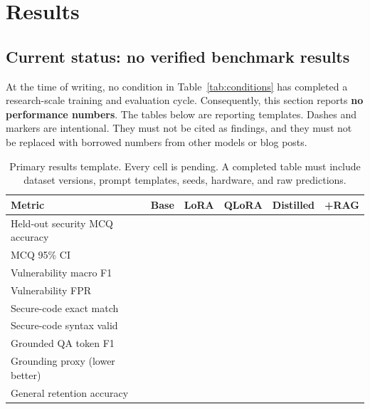 \section{Results}
\label{sec:results}

\subsection{Current status: no verified benchmark results}

At the time of writing, no condition in Table~\ref{tab:conditions} has completed a
research-scale training and evaluation cycle. Consequently, this section reports
\textbf{no performance numbers}. The tables below are reporting templates. Dashes
and \pending{} markers are intentional. They must not be cited as
findings, and they must not be replaced with borrowed numbers from other models
or blog posts.

\begin{table}[t]
\centering
\small
\caption{Primary results template. Every cell is pending. A completed table must
include dataset versions, prompt templates, seeds, hardware, and raw
predictions.}
\label{tab:results-main}
\setlength{\tabcolsep}{4pt}
\begin{tabular}{@{}lrrrrr@{}}
\toprule
Metric & Base & LoRA & QLoRA & Distilled & +RAG \\
\midrule
Held-out security MCQ accuracy & \pending{} & \pending{} & \pending{} & \pending{} & \pending{} \\
MCQ 95\% CI & \pending{} & \pending{} & \pending{} & \pending{} & \pending{} \\
Vulnerability macro F1 & \pending{} & \pending{} & \pending{} & \pending{} & \pending{} \\
Vulnerability FPR & \pending{} & \pending{} & \pending{} & \pending{} & \pending{} \\
Secure-code exact match & \pending{} & \pending{} & \pending{} & \pending{} & \pending{} \\
Secure-code syntax valid & \pending{} & \pending{} & \pending{} & \pending{} & \pending{} \\
Grounded QA token F1 & \pending{} & \pending{} & \pending{} & \pending{} & \pending{} \\
Grounding proxy (lower better) & \pending{} & \pending{} & \pending{} & \pending{} & \pending{} \\
General retention accuracy & \pending{} & \pending{} & \pending{} & \pending{} & \pending{} \\
\bottomrule
\end{tabular}
\end{table}

